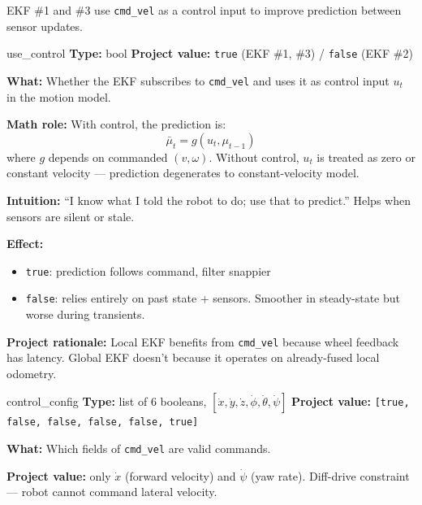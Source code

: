 \documentclass[11pt,a4paper]{article}
\begin{document}
EKF \#1 and \#3 use \texttt{cmd\_vel} as a control input to improve prediction between sensor updates.

\begin{paramcard}{use\_control}
\textbf{Type:} bool \quad \textbf{Project value:} \texttt{true} (EKF \#1, \#3) / \texttt{false} (EKF \#2)

\textbf{What:} Whether the EKF subscribes to \texttt{cmd\_vel} and uses it as control input $u_t$ in the motion model.

\textbf{Math role:} With control, the prediction is:
\[
\bar{\mu}_t = g(u_t, \mu_{t-1})
\]
where $g$ depends on commanded $(v, \omega)$. Without control, $u_t$ is treated as zero or constant velocity --- prediction degenerates to constant-velocity model.

\textbf{Intuition:} ``I know what I told the robot to do; use that to predict.'' Helps when sensors are silent or stale.

\textbf{Effect:}
\begin{itemize}
\item \texttt{true}: prediction follows command, filter snappier
\item \texttt{false}: relies entirely on past state + sensors. Smoother in steady-state but worse during transients.
\end{itemize}

\textbf{Project rationale:} Local EKF benefits from \texttt{cmd\_vel} because wheel feedback has latency. Global EKF doesn't because it operates on already-fused local odometry.
\end{paramcard}

\begin{paramcard}{control\_config}
\textbf{Type:} list of 6 booleans, $[\dot{x}, \dot{y}, \dot{z}, \dot{\phi}, \dot{\theta}, \dot{\psi}]$ \quad \textbf{Project value:} \texttt{[true, false, false, false, false, true]}

\textbf{What:} Which fields of \texttt{cmd\_vel} are valid commands.

\textbf{Project value:} only $\dot{x}$ (forward velocity) and $\dot{\psi}$ (yaw rate). Diff-drive constraint --- robot cannot command lateral velocity.
\end{paramcard}
\end{document}
